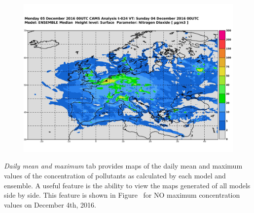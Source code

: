 \documentclass[9pt]{report}
\begin{document}
\begin{figure}[h!]%
\begin{mdcenter}%

\noindent{}\includegraphics[keepaspectratio=true,width=\dimmin{}{\dimwidth{0.90}}]{images/ensemble_analysis_surface}{}%

\mdhr{}%

\noindent{}%
\end{mdcenter}\label{ensemble-maps}%
\end{figure}%

\noindent{}\emph{Daily mean and maximum} tab provides maps of the daily mean and maximum values of the concentration of pollutants as calculated by each model and ensemble.
A useful feature is the ability to view the maps generated of all models side by side.
This feature is shown in Figure~ for NO maximum concentration values on December 4th, 2016.%
\end{document}
